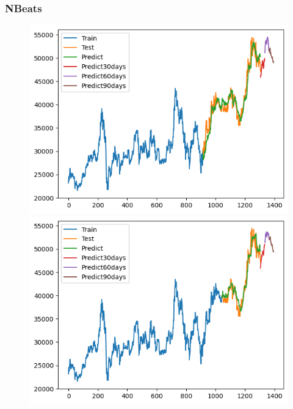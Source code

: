 \subsubsection{NBeats}
\begin{figure}[H]
    \centering
    \begin{minipage}{0.15\textwidth}
    \centering
    \includegraphics[width=1\textwidth]{resources/chapter-5/newdata1/result/BIDV_NBeats_7-3.png}
    \end{minipage}
    \hfill
    \begin{minipage}{0.15\textwidth}
    \centering
    \includegraphics[width=1\textwidth]{resources/chapter-5/newdata1/result/BIDV_NBeats_8-2.png}
    \end{minipage}
    \hfill
        \begin{minipage}{0.15\textwidth}

\end{minipage}
\end{figure}
